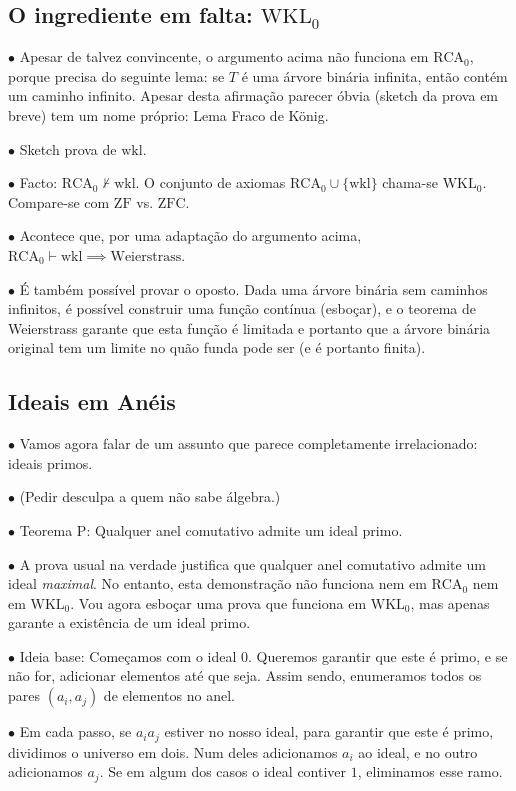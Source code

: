 \documentclass{article}
\theoremstyle{nonumberplain}
\newcommand{\RCA}{\mathrm{RCA}}
\newcommand{\WKL}{\mathrm{WKL}}
\newcommand{\ZFC}{\mathrm{ZFC}}
\newcommand{\ZF}{\mathrm{ZF}}
\newcommand{\wkl}{\mathrm{wkl}}
\newcommand\point[1]{\noindent \hspace{\labelsep} $\bullet$ #1 \smallskip}
\begin{document}
\subsection{O ingrediente em falta: $\WKL_0$}

\point{Apesar de talvez convincente, o argumento acima não funciona em $\RCA_0$, porque precisa do seguinte lema: se $T$ é uma árvore binária infinita, então contém um caminho infinito. Apesar desta afirmação parecer óbvia (sketch da prova em breve) tem um nome próprio: Lema Fraco de König.}

\point{Sketch prova de $\wkl$.}

\point{Facto: $\RCA_0 \nvdash \wkl$. O conjunto de axiomas $\RCA_0 \cup \{\wkl\}$ chama-se $\WKL_0$. Compare-se com $\ZF$ vs. $\ZFC$.}

\point{Acontece que, por uma adaptação do argumento acima, $\RCA_0 \vdash \wkl \implies \text{Weierstrass}$.}

\point{É também possível provar o oposto. Dada uma árvore binária sem caminhos infinitos, é possível construir uma função contínua (esboçar), e o teorema de Weierstrass garante que esta função é limitada e portanto que a árvore binária original tem um limite no quão funda pode ser (e é portanto finita).}

\subsection{Ideais em Anéis}

\point{Vamos agora falar de um assunto que parece completamente irrelacionado: ideais primos.}

\point{(Pedir desculpa a quem não sabe álgebra.)}

\point{Teorema $\mathrm{P}$: Qualquer anel comutativo admite um ideal primo.}

\point{A prova usual na verdade justifica que qualquer anel comutativo admite um ideal \emph{maximal}. No entanto, esta demonstração não funciona nem em $\RCA_0$ nem em $\WKL_0$. Vou agora esboçar uma prova que funciona em $\WKL_0$, mas apenas garante a existência de um ideal primo.}

\point{Ideia base: Começamos com o ideal $0$. Queremos garantir que este é primo, e se não for, adicionar elementos até que seja. Assim sendo, enumeramos todos os pares $(a_i, a_j)$ de elementos no anel.}

\point{Em cada passo, se $a_i a_j$ estiver no nosso ideal, para garantir que este é primo, dividimos o universo em dois. Num deles adicionamos $a_i$ ao ideal, e no outro adicionamos $a_j$. Se em algum dos casos o ideal contiver $1$, eliminamos esse ramo.}
\end{document}
